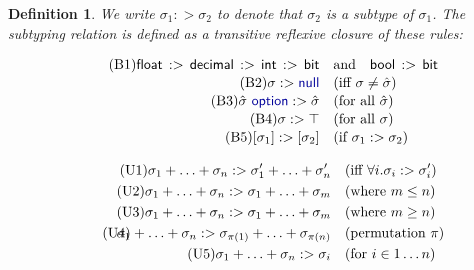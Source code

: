 \documentclass[preprint]{sigplanconf}
\newcommand{\kvd}[1]{\textnormal{\textcolor{kvdclr}{\sffamily #1}}}
\newcommand{\ident}[1]{\textnormal{\sffamily #1}}
\newtheorem{definition}{Definition}
\begin{document}
\begin{definition}
We write $\sigma_1 :> \sigma_2$ to denote that $\sigma_2$ is a subtype of $\sigma_1$. The 
subtyping relation is defined as a transitive reflexive closure of these rules:

\vspace{0.5em}
\noindent{}
\begin{align}
\label{eq:sub-prim}\tag{B1}
\ident{float}\,:>\,\ident{decimal}\,:>\,\ident{int}\,:>\,\ident{bit}\quad&\textnormal{and}\quad\ident{bool}\,:>\,\ident{bit}\\[-0.2em]
\label{eq:sub-null}\tag{B2}
\sigma :> \kvd{null} \quad &(\textnormal{iff}~\sigma \neq \hat{\sigma}) \\[-0.2em]
\label{eq:sub-opt}\tag{B3}
\hat{\sigma}~\kvd{option} :> \hat{\sigma} \quad &(\textnormal{for all}~\hat{\sigma})\\[-0.2em]
\label{eq:sub-top}\tag{B4}
\sigma :> \top \quad &(\textnormal{for all}~\sigma)\\[-0.2em]
\label{eq:sub-col}\tag{B5}
[\sigma_1] :> [\sigma_2] \quad &(\textnormal{if}~\sigma_1 :> \sigma_2)
\end{align}

\noindent{}
\begin{align}
\label{eq:sub-union1}\tag{U1}
\sigma_1 + \ldots + \sigma_n :> \sigma_1' + \ldots + \sigma_n' \quad &(\textnormal{iff}~\forall i.\sigma_i :> \sigma_i') \\
\label{eq:sub-union2}\tag{U2}
\sigma_1 + \ldots + \sigma_n :> \sigma_1 + \ldots + \sigma_m \quad &(\textnormal{where}~m \leq n) \\
\label{eq:sub-union3}\tag{U3}
\sigma_1 + \ldots + \sigma_n :> \sigma_1 + \ldots + \sigma_m \quad &(\textnormal{where}~m \geq n) \\
\label{eq:sub-union4}\tag{U4}
\hspace{-1em}\sigma_1 + \ldots + \sigma_n :> \sigma_{\pi(1)} + \ldots + \sigma_{\pi(n)} \quad &(\textnormal{permutation}~\pi) \\
\label{eq:sub-union-el}\tag{U5}
\sigma_1 + \ldots + \sigma_n :> \sigma_i \quad &(\textnormal{for}~i \in 1 \ldots n)
\end{align}


\end{definition}
\end{document}
